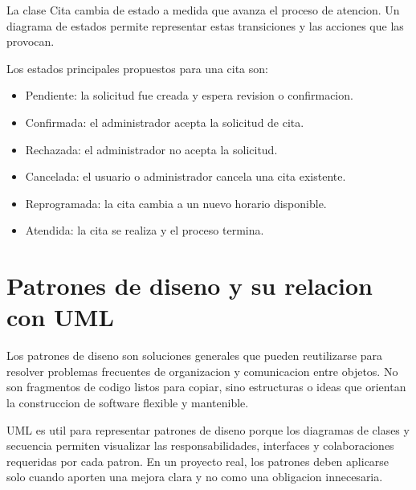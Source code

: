 \documentclass[12pt,letterpaper]{article}
\begin{document}
La clase Cita cambia de estado a medida que avanza el proceso de atencion. Un diagrama de estados permite representar estas transiciones y las acciones que las provocan.

Los estados principales propuestos para una cita son:

\begin{itemize}[leftmargin=1.2cm]
    \item Pendiente: la solicitud fue creada y espera revision o confirmacion.
    \item Confirmada: el administrador acepta la solicitud de cita.
    \item Rechazada: el administrador no acepta la solicitud.
    \item Cancelada: el usuario o administrador cancela una cita existente.
    \item Reprogramada: la cita cambia a un nuevo horario disponible.
    \item Atendida: la cita se realiza y el proceso termina.
\end{itemize}


\section{Patrones de diseno y su relacion con UML}

Los patrones de diseno son soluciones generales que pueden reutilizarse para resolver problemas frecuentes de organizacion y comunicacion entre objetos. No son fragmentos de codigo listos para copiar, sino estructuras o ideas que orientan la construccion de software flexible y mantenible.

UML es util para representar patrones de diseno porque los diagramas de clases y secuencia permiten visualizar las responsabilidades, interfaces y colaboraciones requeridas por cada patron. En un proyecto real, los patrones deben aplicarse solo cuando aporten una mejora clara y no como una obligacion innecesaria.
\end{document}
